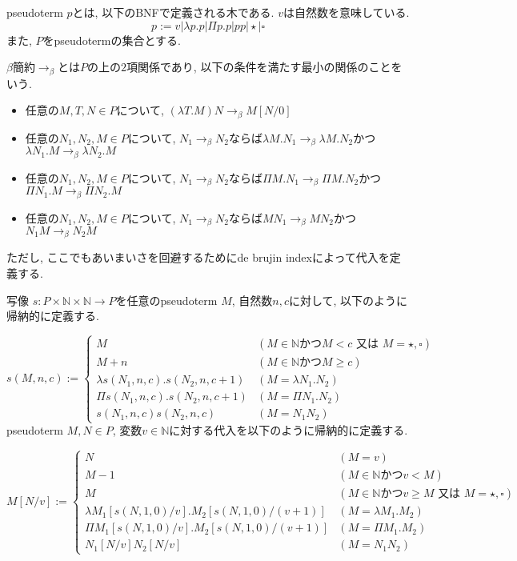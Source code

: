 \documentclass[12pt]{ltjsarticle}
\begin{document}
\begin{defn}
 pseudoterm $p$とは, 以下のBNFで定義される木である. $v$は自然数を意味している.
 \[
 p := v | \lambda p. p | \Pi p. p | p p | \star | \square
 \]
 また, $P$をpseudotermの集合とする.
\end{defn}

\begin{defn}
 $\beta$簡約$\rightarrow_{\beta}$とは$P$の上の$2$項関係であり, 以下の条件を満たす最小の関係のことをいう.
 \begin{itemize}
  \item 任意の$M, T, N \in P$について, $(\lambda T. M) N \rightarrow_\beta M[N/0]$
  \item 任意の$N_1, N_2, M \in P$について, $N_1 \rightarrow_\beta N_2$ならば$\lambda M. N_1 \rightarrow_\beta \lambda M. N_2$かつ$\lambda N_1. M \rightarrow_\beta \lambda N_2. M$
  \item 任意の$N_1, N_2, M \in P$について, $N_1 \rightarrow_\beta N_2$ならば$\Pi M. N_1 \rightarrow_\beta \Pi M. N_2$かつ$\Pi N_1. M \rightarrow_\beta \Pi N_2. M$
  \item 任意の$N_1, N_2, M \in P$について, $N_1 \rightarrow_\beta N_2$ならば$M N_1 \rightarrow_\beta M N_2$かつ$N_1 M \rightarrow_\beta N_2 M$
 \end{itemize}
\end{defn}

 ただし, ここでもあいまいさを回避するためにde brujin indexによって代入を定義する.

\begin{defn}
 写像 $s \colon P \times \mathbb{N} \times \mathbb{N} \rightarrow P$を任意のpseudoterm $M$, 自然数$n, c$に対して, 以下のように帰納的に定義する.

\[
  s (M, n, c) := \begin{cases}
    M & (M \in \mathbb{N} \text{かつ} M < c \text{ 又は } M = \star, \square) \\
    M + n & (M \in \mathbb{N} \text{かつ} M \geq c) \\
    \lambda s (N_1, n, c). s (N_2, n, c + 1) & (M = \lambda N_1. N_2) \\
    \Pi s (N_1, n, c). s (N_2, n, c + 1) & (M = \Pi N_1. N_2) \\
    s (N_1, n, c) s (N_2, n, c) & (M = N_1 N_2)
  \end{cases}
\]
 pseudoterm $M, N \in P$, 変数$v \in \mathbb{N}$に対する代入を以下のように帰納的に定義する.

\[
 M[N/v] := \begin{cases}
    N & (M = v) \\
    M - 1 & (M \in \mathbb{N} \text{かつ} v < M) \\
    M & (M \in \mathbb{N} \text{かつ} v \geq M \text{ 又は } M = \star, \square) \\
    \lambda M_1 [s (N, 1, 0)/v]. M_2 [s (N, 1, 0)/(v + 1)] & (M = \lambda M_1. M_2) \\
    \Pi M_1 [s (N, 1, 0)/v]. M_2 [s (N, 1, 0)/(v + 1)] & (M = \Pi M_1. M_2) \\
    N_1[N/v] N_2[N/v] & (M = N_1 N_2)
  \end{cases}
\]
\end{defn}
\end{document}
